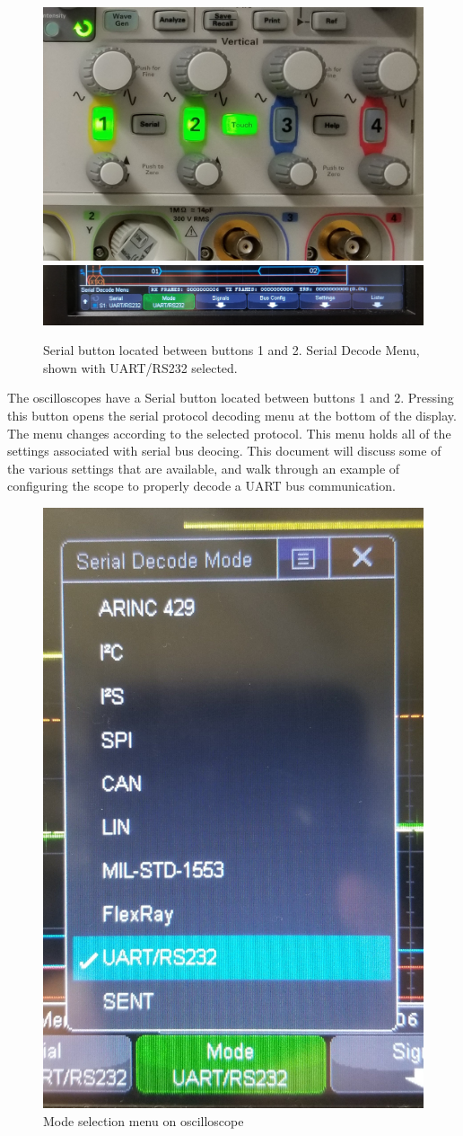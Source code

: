 \documentclass{article}
\begin{document}
  \begin{figure}
    \includegraphics[width=44ex]{serial_button_scope}
    \includegraphics[width=44ex]{serial_decode_scope}
    \caption{Serial button located between buttons 1 and 2. Serial Decode Menu,
      shown with UART/RS232 selected.}
  \end{figure}

  The oscilloscopes have a Serial button located between buttons 1 and 2.
  Pressing this button opens the serial protocol decoding menu at the bottom of
  the display. The menu changes according to the selected protocol. This menu
  holds all of the settings associated with serial bus deocing. This
  document will discuss some of the various settings that are available, and
  walk through an example of configuring the scope to properly decode a UART bus
  communication.

  \begin{figure}
    \includegraphics[width=25ex]{mode_menu}
    \caption{Mode selection menu on oscilloscope}
    \label{fig:uart_mode_menu}
  \end{figure}
\end{document}
